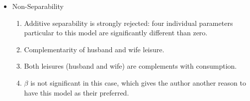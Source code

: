 \documentclass[notes=show]{beamer}
\begin{document}
\begin{frame}%


\begin{itemize}
\item Non-Separability

\begin{enumerate}
\item Additive separability is strongly rejected: four individual parameters
particular to this model are significantly different than zero.

\item Complementarity of husband and wife leisure.

\item Both leisures (husband and wife) are complements with consumption.

\item $\beta $ is not significant in this case, which gives the author
another reason to have this model as their preferred.
\end{enumerate}
\end{itemize}

\transboxout%
\end{frame}%

\bigskip
\end{document}
